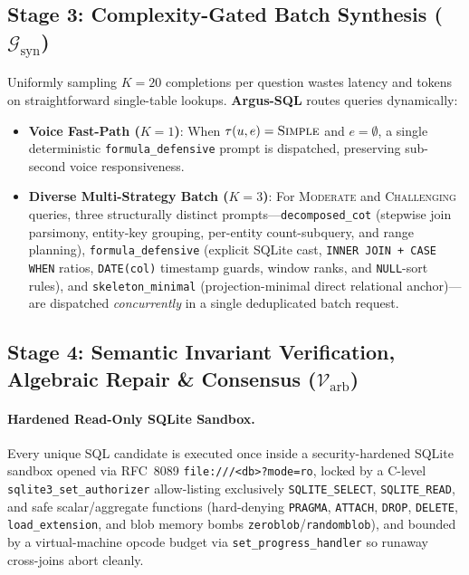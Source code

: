 \documentclass[10pt,twocolumn]{article}
\begin{document}
\subsection{Stage 3: Complexity-Gated Batch Synthesis (\texorpdfstring{$\mathcal{G}_{\text{syn}}$}{G\_syn})}
Uniformly sampling $K=20$ completions per question wastes latency and tokens on straightforward single-table lookups. \textbf{Argus-SQL} routes queries dynamically:
\begin{itemize}
  \item \textbf{Voice Fast-Path ($K=1$)}: When $\tau(u,e) = \textsc{Simple}$ and $e = \emptyset$, a single deterministic \texttt{formula\_defensive} prompt is dispatched, preserving sub-second voice responsiveness.
  \item \textbf{Diverse Multi-Strategy Batch ($K=3$)}: For \textsc{Moderate} and \textsc{Challenging} queries, three structurally distinct prompts—\texttt{decomposed\_cot} (stepwise join parsimony, entity-key grouping, per-entity count-subquery, and range planning), \texttt{formula\_defensive} (explicit SQLite cast, \texttt{INNER JOIN + CASE WHEN} ratios, \texttt{DATE(col)} timestamp guards, window ranks, and \texttt{NULL}-sort rules), and \texttt{skeleton\_minimal} (projection-minimal direct relational anchor)—are dispatched \emph{concurrently} in a single deduplicated batch request.
\end{itemize}

\subsection{Stage 4: Semantic Invariant Verification, Algebraic Repair \& Consensus (\texorpdfstring{$\mathcal{V}_{\text{arb}}$}{V\_arb})}
\label{sec:verification}

\paragraph{Hardened Read-Only SQLite Sandbox.}
Every unique SQL candidate is executed once inside a security-hardened SQLite sandbox opened via RFC~8089 \texttt{file:///\allowbreak <db>?\allowbreak mode=ro}, locked by a C-level \texttt{sqlite3\_\allowbreak set\_\allowbreak authorizer} allow-listing exclusively \texttt{SQLITE\_\allowbreak SELECT}, \texttt{SQLITE\_\allowbreak READ}, and safe scalar/aggregate functions (hard-denying \texttt{PRAGMA}, \texttt{ATTACH}, \texttt{DROP}, \texttt{DELETE}, \texttt{load\_\allowbreak extension}, and blob memory bombs \texttt{zeroblob}/\allowbreak\texttt{randomblob}), and bounded by a virtual-machine opcode budget via \texttt{set\_\allowbreak progress\_\allowbreak handler} so runaway cross-joins abort cleanly.
\end{document}

